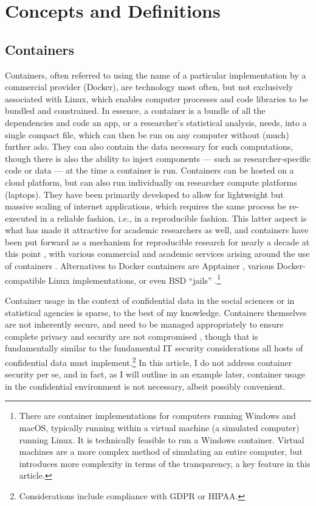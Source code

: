 \documentclass[inline]{hdsr}
\begin{document}
\section{Concepts and Definitions}

\subsection{Containers}

Containers, often referred to using the name of a particular implementation by a commercial provider (Docker), are technology most often, but not exclusively associated with Linux, which enables computer processes and code libraries to be bundled and constrained. In essence, a container is a bundle of all the dependencies and code an app, or a researcher's statistical analysis, needs, into a single compact file, which can then be run on any computer without (much) further ado. They can also contain the data necessary for such computations, though there is also the ability to inject components --- such as researcher-specific code or data --- at the time a container is run. Containers can be hosted on a cloud platform, but can also run individually on researcher compute platforms (laptops).  They have been primarily developed to allow for lightweight but massive scaling of internet applications, which requires the same process be re-executed in a reliable fashion, i.e., in a reproducible fashion. This latter aspect is what has made it attractive for academic researchers as well, and containers have been put forward as a mechanism for reproducible research for nearly a decade at this point \citep{boettiger_introduction_2015}, with various commercial and academic services arising around the use of containers \citep{clyburne-sherin_computational_2019,chard_toward_2020,brinckman_computing_2018}. Alternatives to Docker containers are Apptainer \citep{contributors_to_the_apptainer_project_apptainer_2025}, various Docker-compatible Linux implementations, or even BSD ``jails'' \citep{the_freebsd_project_chapter_2025}.\footnote{There are container implementations for computers running Windows and macOS, typically running within a virtual machine (a simulated computer) running Linux. It is technically feasible to run a Windows container. Virtual machines are a more complex method of simulating an entire computer, but introduces more complexity in terms of the transparency, a key feature in this article.} 

Container usage in the context of confidential data in the social sciences or in statistical agencies is sparse, to the best of my knowledge. Containers themselves are not inherently secure, and need to be managed appropriately to ensure complete privacy and security are not compromised \citep[see][]{souppaya_application_2017}, though that is fundamentally similar to the fundamental IT security considerations all hosts of confidential data must implement.\footnote{Considerations include compliance with \ac{GDPR} or \ac{HIPAA}.} In this article, I do not address container security per se, and in fact, as I will outline in an example later, container usage in the confidential environment is not necessary, albeit possibly convenient.  
\end{document}
